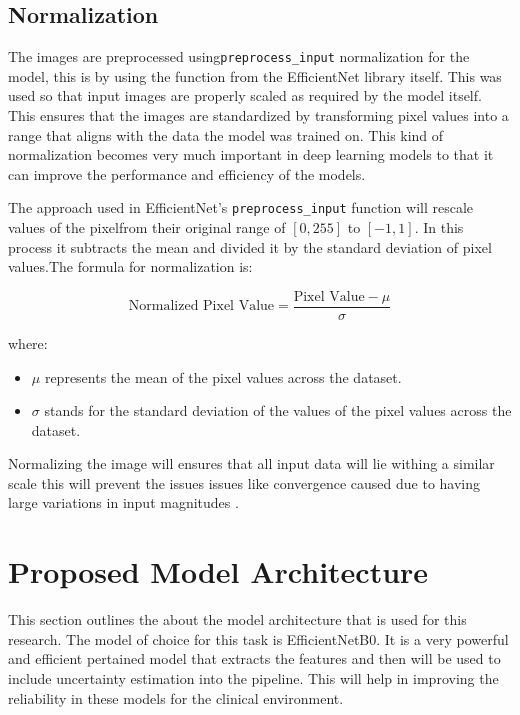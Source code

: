 \documentclass[12pt,onecolumn]{report}
\begin{document}
\subsection{Normalization}
The images are preprocessed using\texttt{preprocess\_input} normalization for the model, this is by using the  function from the EfficientNet library itself. This was used so that input images are properly scaled as required by the model itself. This ensures that the images are standardized by transforming pixel values into a range that aligns with the data the model was trained on. This kind of normalization becomes very much important in deep learning models to that it can improve the performance and efficiency of the models\cite{tan2019efficientnet}.

The approach used in EfficientNet's \texttt{preprocess\_input} function will rescale values of the pixelfrom their original range of $[0, 255]$ to $[-1, 1]$. In this process it subtracts the mean and divided it by the standard deviation of pixel values.The formula for normalization is:

\[
\text{Normalized Pixel Value} = \frac{\text{Pixel Value} - \mu}{\sigma}
\]

where:
\begin{itemize}
    \item $\mu$ represents the mean of the pixel values across the dataset.
    \item $\sigma$ stands for the standard deviation of the values of the pixel values across the dataset.
\end{itemize}

Normalizing the image will ensures that all input data will lie withing a similar scale this will prevent the issues issues like convergence caused due to having large variations in input magnitudes \cite{he2015delving}.

\section{Proposed Model Architecture}
This section outlines the about the model architecture that is used for this research. The model of choice for this task is EfficientNetB0. It is a very powerful and efficient pertained model that extracts the features and then will be used to include uncertainty estimation into the pipeline. This will help in improving the reliability in these models for the clinical environment.
\end{document}
